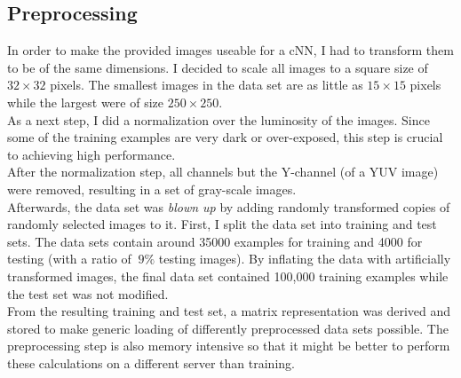 \documentclass[11pt,a4paper]{article}
\begin{document}
\subsection{Preprocessing}
In order to make the provided images useable for a cNN, I had to transform them to be of the same dimensions. I decided to scale all images to a square size of $32 \times 32$ pixels. The smallest images in the data set are as little as $15 \times 15$ pixels while the largest were of size $250 \times 250$.\\
As a next step, I did a normalization over the luminosity of the images. Since some of the training examples are very dark or over-exposed, this step is crucial to achieving high performance.\\
After the normalization step, all channels but the Y-channel (of a YUV image) were removed, resulting in a set of gray-scale images.\\
Afterwards, the data set was \textit{blown up} by adding randomly transformed copies of randomly selected images to it. First, I split the data set into training and test sets. The data sets contain around 35000 examples for training and 4000 for testing (with a ratio of $~9\%$ testing images). By inflating the data with artificially transformed images, the final data set contained 100,000 training examples while the test set was not modified.\\
From the resulting training and test set, a matrix representation was derived and stored to make generic loading of differently preprocessed data sets possible. The preprocessing step is also memory intensive so that it might be better to perform these calculations on a different server than training.
\end{document}
